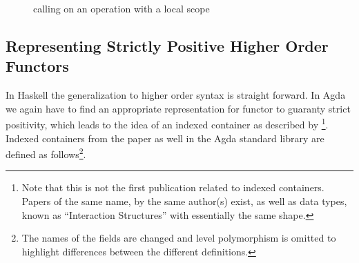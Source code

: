 \begin{figure}
  \begin{center}
  \end{center}
  \caption{calling \bind{} on an operation with a local scope}
  \label{higher-order:syntax:bind}
\end{figure}


\subsection{Representing Strictly Positive Higher Order Functors}
\label{higher-order:container}

In Haskell the generalization to higher order syntax is straight forward.
In Agda we again have to find an appropriate representation for functor to
guaranty strict positivity, which leads to the idea of an indexed container as
described by \textcite{DBLP:journals/jfp/AltenkirchGHMM15}
\footnote{Note that this is not the first publication related to indexed
  containers. Papers of the same name, by the same author(s) exist, as well as
  data types, known as ``Interaction Structures'' with essentially the same
  shape.}. 
Indexed containers from the paper as well in the Agda standard library are
defined as follows\footnote{The names of the fields are changed and level
  polymorphism is omitted to highlight differences between the different
  definitions.}.

